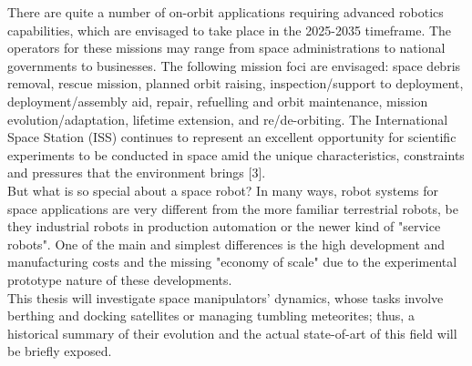 \documentclass[a4paper,12pt,oneside]{report}
\begin{document}
There are quite a number of on-orbit applications requiring advanced robotics capabilities, which
are envisaged to take place in the 2025-2035 timeframe. The operators for these missions may
range from space administrations to national governments to businesses. The following mission
foci are envisaged: space debris removal, rescue mission, planned orbit raising,
inspection/support to deployment, deployment/assembly aid, repair, refuelling and orbit
maintenance, mission evolution/adaptation, lifetime extension, and re/de-orbiting. The
International Space Station (ISS) continues to represent an excellent opportunity for scientific
experiments to be conducted in space amid the unique characteristics, constraints and pressures that the environment brings [3].\\
But what is so special about a space robot? In many ways, robot systems for space applications are very different from the more familiar terrestrial robots, be they industrial robots in production automation or the newer kind of "service robots". One of the main and simplest differences is the high development and manufacturing costs and the missing "economy of scale" due to the experimental prototype nature of these developments.\\
This thesis will investigate space manipulators' dynamics, whose tasks involve berthing and docking satellites or managing tumbling meteorites; thus, a historical summary of their evolution and the actual state-of-art of this field will be briefly exposed.
\newpage
\end{document}
